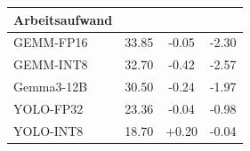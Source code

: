 \begin{tabular}{@{}lS[table-format=2.2]S[table-format=+1.2]S[table-format=+1.2]@{}}
\toprule
Arbeitsaufwand & {} & {} & {} \\
\midrule
GEMM-FP16 & 33.85 & -0.05 & -2.30 \\
GEMM-INT8 & 32.70 & -0.42 & -2.57 \\
Gemma3-12B & 30.50 & -0.24 & -1.97 \\
YOLO-FP32 & 23.36 & -0.04 & -0.98 \\
YOLO-INT8 & 18.70 & +0.20 & -0.04 \\
\bottomrule
\end{tabular}

